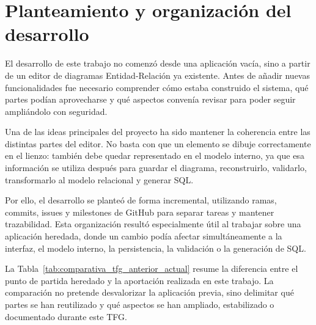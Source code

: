 
\section{Planteamiento y organización del desarrollo}

El desarrollo de este trabajo no comenzó desde una aplicación vacía, sino a partir de un editor de diagramas Entidad-Relación ya existente. Antes de añadir nuevas funcionalidades fue necesario comprender cómo estaba construido el sistema, qué partes podían aprovecharse y qué aspectos convenía revisar para poder seguir ampliándolo con seguridad.

Una de las ideas principales del proyecto ha sido mantener la coherencia entre las distintas partes del editor. No basta con que un elemento se dibuje correctamente en el lienzo: también debe quedar representado en el modelo interno, ya que esa información se utiliza después para guardar el diagrama, reconstruirlo, validarlo, transformarlo al modelo relacional y generar SQL.

Por ello, el desarrollo se planteó de forma incremental, utilizando ramas, commits, issues y milestones de GitHub para separar tareas y mantener trazabilidad. Esta organización resultó especialmente útil al trabajar sobre una aplicación heredada, donde un cambio podía afectar simultáneamente a la interfaz, el modelo interno, la persistencia, la validación o la generación de SQL.

La Tabla~\ref{tab:comparativa_tfg_anterior_actual} resume la diferencia entre el punto de partida heredado y la aportación realizada en este trabajo. La comparación no pretende desvalorizar la aplicación previa, sino delimitar qué partes se han reutilizado y qué aspectos se han ampliado, estabilizado o documentado durante este TFG.

